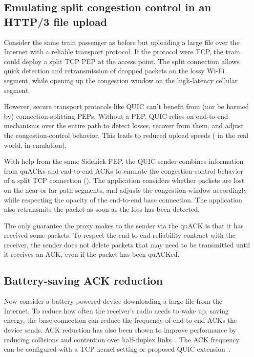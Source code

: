 \subsection{Emulating split congestion control in an HTTP/3 file upload}
\label{sec:sidekick:motivating:http}

Consider the same train passenger as before but uploading a large file over the
Internet with a reliable transport protocol. If the protocol were TCP, the
train could deploy a split TCP PEP at the access point. The split connection
allows quick detection and retransmission of dropped packets on the lossy Wi-Fi
segment, while opening up the congestion window on the high-latency cellular
segment.

However, secure transport protocols like QUIC can't benefit from (nor be harmed
by) connection-splitting PEPs. Without a PEP, QUIC relies on end-to-end
mechanisms over the entire path to detect losses, recover from them, and adjust
the congestion-control behavior. This leads to reduced upload speeds
( in the real world,
 in emulation).

With help from the same Sidekick PEP, the QUIC sender combines information from
quACKs and end-to-end ACKs to emulate the congestion-control behavior of a
split TCP connection (). The
application considers whether packets are lost on the near or far path
segments, and adjusts the congestion window accordingly while respecting the
opacity of the end-to-end base connection. The application also retransmits the
packet as soon as the loss has been detected.

The only guarantee the proxy makes to the sender via the quACK is that it has
received some packets. To respect the end-to-end reliability contract with the
receiver, the sender does not delete packets that may need to be transmitted
until it receives an ACK, even if the packet has been quACKed.

\subsection{Battery-saving ACK reduction}
\label{sec:sidekick:motivating:ack-reduction}

Now consider a battery-powered device downloading a large file from the
Internet. To reduce how often the receiver's
radio needs to wake up, saving energy, the base connection can reduce the
frequency of end-to-end ACKs the device sends.
ACK reduction has also been shown to improve performance by reducing collisions
and contention over half-duplex links~\cite{custura2023reducing,li2020tack}.
The ACK frequency can be configured with a TCP kernel setting or proposed
QUIC extension~\cite{ietf-quic-ack-frequency-07}.

